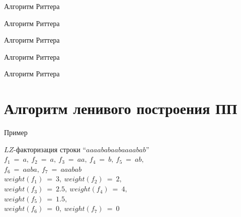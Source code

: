 \documentclass[utf8]{beamer}
\begin{document}
\begin{frame}
	\begin{block}{Алгоритм Риттера}
		\picRytterFirth        
	\end{block}
\end{frame}

\begin{frame}
	\begin{block}{Алгоритм Риттера}
		\picRytterSixth                
	\end{block}
\end{frame}

\begin{frame}
	\begin{block}{Алгоритм Риттера}
		\picRytterSeventh                 
	\end{block}
\end{frame}

\begin{frame}
	\begin{block}{Алгоритм Риттера}
		\picRytterEighth                    
	\end{block}
\end{frame}

\begin{frame}
	\begin{block}{Алгоритм Риттера}
		\picRytterNinth                           
	\end{block}
\end{frame}


\section{Алгоритм ленивого построения ПП}
\begin{frame}
	\begin{exampleblock}{Пример}
		\begin{center} 
			$LZ$-факторизация строки ``$aaaababaabaaaabab$''\\ 
			$f_1\ =\ a,\ f_2\ =\ a,\ f_3\ =\ aa,\ f_4\ =\ b,\ f_5\ =\ ab,$ \\$f_6\ =\
			aaba,\ f_7\ =\ aaabab$\\
				$weight(f_1)\ =\ 3,\ weight(f_2)\ =\ 2,$ \\$weight(f_3)\ =\ 2.5,\ weight(f_4)\
				=\ 4,$ \\$weight(f_5)\ =\ 1.5,$ \\$weight(f_6)\ =\ 0,\ weight(f_7)\ =\ 0$
		\end{center}  
	\end{exampleblock}
\end{frame}
\end{document}
